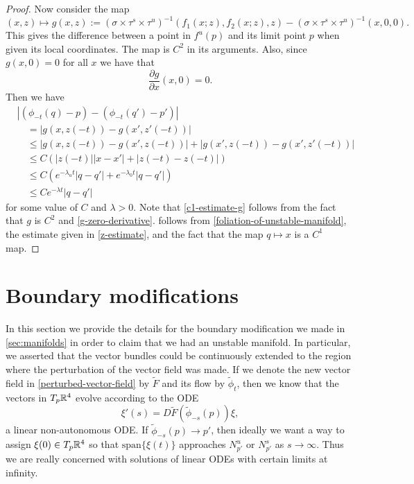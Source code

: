 \begin{proof}
	Now consider the map
	\begin{equation*}
		(x,z) \mapsto g(x,z) := (\sigma \times \tau^s \times \tau^u)^{-1}(f_1(x;z) , f_2(x;z), z) - (\sigma \times \tau^s \times \tau^u)^{-1}(x,0,0).
	\end{equation*}
	This gives the difference between a point in \(f^u(p)\) and its limit point \(p\) when given its local coordinates. The map is \(C^2\) in its arguments. Also, since \(g(x,0)= 0\) for all \(x\) we have that
	\begin{equation}\label{g-zero-derivative}
		\frac{\partial g}{\partial x}(x,0) = 0.
	\end{equation}
	Then we have 
	\begin{align}
		&|(\phi_{-t}(q) - p) - (\phi_{-t}(q') - p')| \nonumber \\
		&\quad= |g(x, z(-t)) - g(x',z'(-t))| \nonumber \\
		&\quad\leq |g(x, z(-t)) - g(x',z(-t)) | + |g(x',z(-t)) - g(x',z'(-t))| \nonumber \\
		&\quad\leq C(|z(-t)||x-x'| + |z(-t) -z(-t)|)  \label{c1-estimate-g}\\
		&\quad \leq C(e^{-\lambda_u t} |q-q'| + e^{-\lambda_0 t} |q-q'|) \label{exponential-estimate-g} \\
		&\quad \leq C e^{-\lambda t} |q-q'| \nonumber
	\end{align}
	for some value of \(C\) and \(\lambda>0\). Note that \cref{c1-estimate-g} follows from the fact that \(g\) is \(C^2\) and \cref{g-zero-derivative}.  follows from \cref{foliation-of-unstable-manifold}, the estimate given in \cref{z-estimate}, and the fact that the map \(q\mapsto x\) is a \(C^1\) map.
\end{proof}
\section{Boundary modifications}\label{sec:boundary-modifications}

In this section we provide the details for the boundary modification we made in \cref{sec:manifolds} in order to claim that we had an unstable manifold. In particular, we asserted that the vector bundles could be continuously extended to the region where the perturbation of the vector field was made. If we denote the new vector field in \cref{perturbed-vector-field} by \(\tilde F\) and its flow by \(\tilde \phi_t\), then we know that the vectors in \(T_p\mathbb{R}^4\) evolve according to the ODE
\begin{equation}\label{flow-tangent-vectors-perturbed}
	\xi'(s) = D\tilde F(\tilde \phi_{-s}(p)) \xi,
\end{equation}
a linear non-autonomous ODE. If \(\tilde \phi_{-s}(p) \to p'\), then ideally we want a way to assign \(\xi(0) \in T_p\mathbb{R}^4\) so that \(\mathrm{span}\{\xi(t)\}\) approaches \(N^u_{p'}\) or \(N^s_{p'}\) as \(s\to \infty\). Thus we are really concerned with solutions of linear ODEs with certain limits at infinity.

